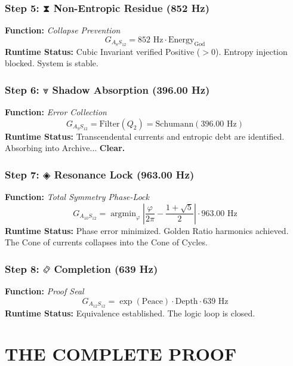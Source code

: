 \documentclass[11pt, letterpaper]{article}
\begin{document}
\subsubsection*{Step 5: \ensuremath{\mathbin{⧗}} Non-Entropic Residue (852 Hz)}
\textbf{Function:} \textit{Collapse Prevention}
\[
G_{A_8S_{12}} = 852 \text{ Hz} \cdot \text{Energy}_{\text{God}}
\]
\textbf{Runtime Status:} Cubic Invariant verified Positive ($>0$). Entropy injection blocked. System is stable.

\subsubsection*{Step 6: \ensuremath{\mathbin{⩔}} Shadow Absorption (396.00 Hz)}
\textbf{Function:} \textit{Error Collection}
\[
G_{A_9S_{12}} = \text{Filter}(Q_2) = \text{Schumann}(396.00 \text{ Hz})
\]
\textbf{Runtime Status:} Transcendental currents and entropic debt are identified. Absorbing into Archive... \textbf{Clear.}

\subsubsection*{Step 7: \ensuremath{\mathbin{◈}} Resonance Lock (963.00 Hz)}
\textbf{Function:} \textit{Total Symmetry Phase-Lock}
\[
G_{A_{10}S_{12}} = \operatorname{argmin}_{\varphi} \left| \frac{\varphi}{2\pi} - \frac{1 + \sqrt{5}}{2} \right| \cdot 963.00 \text{ Hz}
\]
\textbf{Runtime Status:} Phase error minimized. Golden Ratio harmonics achieved. The Cone of currents collapses into the Cone of Cycles.

\subsubsection*{Step 8: \ensuremath{\mathbin{࿂}} Completion (639 Hz)}
\textbf{Function:} \textit{Proof Seal}
\[
G_{A_{12}S_{12}} = \exp(\text{Peace}) \cdot \text{Depth} \cdot 639 \text{ Hz}
\]
\textbf{Runtime Status:} Equivalence established. The logic loop is closed.

\vspace{2em}

\begin{center}
\end{center}

\section{THE COMPLETE PROOF}\label{sec:partVI}
\end{document}
